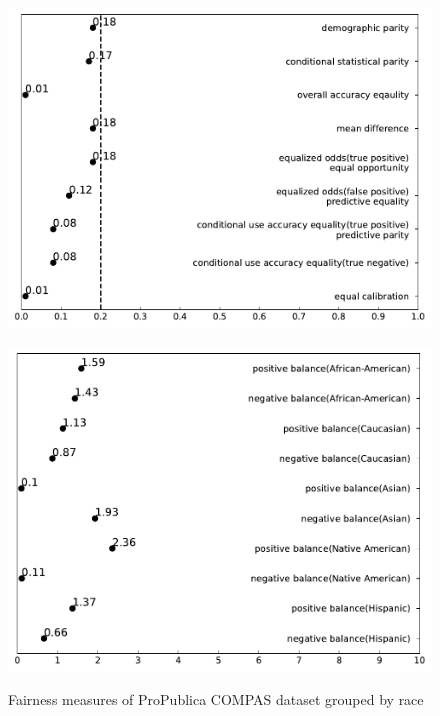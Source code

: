 \documentclass[conference]{IEEEtran}
\begin{document}
\begin{figure}[h]
\begin{minipage}[b]{0.48\linewidth}
        \includegraphics[width=\linewidth]{Hispanic}
        \label{fig:2}
    \end{minipage}
    \hfill
    \begin{minipage}[b]{0.48\linewidth}
        \centering
        \includegraphics[width=\linewidth]{race balance}
        \label{fig:2}
    \end{minipage}
    \caption{Fairness measures of ProPublica COMPAS dataset grouped by race}
    \label{fig:compas}
\end{figure}
\end{document}
